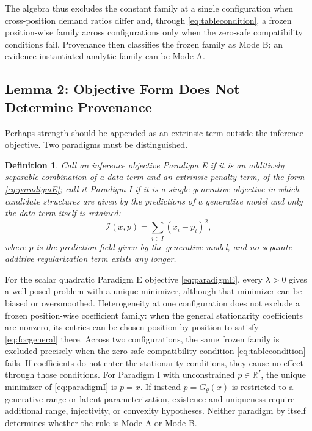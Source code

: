 \documentclass[twoside,11pt]{article}
\newtheorem{defn}{Definition}
\begin{document}
The algebra thus excludes the constant family at a single configuration when cross-position demand ratios differ and, through \eqref{eq:tablecondition}, a frozen position-wise family across configurations only when the zero-safe compatibility conditions fail. Provenance then classifies the frozen family as Mode B; an evidence-instantiated analytic family can be Mode A.

\subsection{Lemma 2: Objective Form Does Not Determine Provenance}

Perhaps strength should be appended as an extrinsic term outside the inference objective. Two paradigms must be distinguished.

\begin{defn}
Call an inference objective \emph{Paradigm E} if it is an additively separable combination of a data term and an extrinsic penalty term, of the form \eqref{eq:paradigmE}; call it \emph{Paradigm I} if it is a single generative objective in which candidate structures are given by the predictions of a generative model and only the data term itself is retained:
\begin{equation}
\mathcal{I}(x, p) = \sum_{i \in I} (x_i - p_i)^2 ,
\label{eq:paradigmI}
\end{equation}
where $p$ is the prediction field given by the generative model, and no separate additive regularization term exists any longer.
\end{defn}

\begin{lemma}
For the scalar quadratic Paradigm E objective \eqref{eq:paradigmE}, every $\lambda>0$ gives a well-posed problem with a unique minimizer, although that minimizer can be biased or oversmoothed. Heterogeneity at one configuration does not exclude a frozen position-wise coefficient family: when the general stationarity coefficients are nonzero, its entries can be chosen position by position to satisfy \eqref{eq:focgeneral} there. Across two configurations, the same frozen family is excluded precisely when the zero-safe compatibility condition \eqref{eq:tablecondition} fails. If coefficients do not enter the stationarity conditions, they cause no effect through those conditions. For Paradigm I with unconstrained $p\in\mathbb{R}^{I}$, the unique minimizer of \eqref{eq:paradigmI} is $p=x$. If instead $p=G_{\theta}(x)$ is restricted to a generative range or latent parameterization, existence and uniqueness require additional range, injectivity, or convexity hypotheses. Neither paradigm by itself determines whether the rule is Mode A or Mode B.
\end{lemma}
\end{document}
